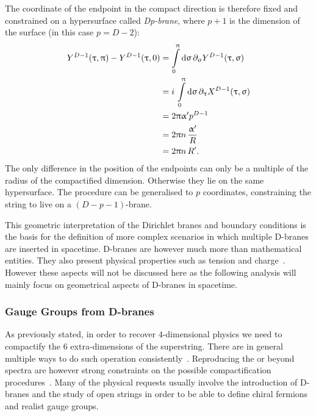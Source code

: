 The coordinate of the endpoint in the compact direction is therefore fixed and constrained on a hypersurface called \emph{Dp-brane}, where $p+1$ is the dimension of the surface (in this case $p = D - 2$):
\begin{equation}
  \begin{split}
    Y^{D-1}( \uptau, \uppi ) - Y^{D-1}( \uptau, 0 )
    & =
    \int\limits_{0}^{\uppi} \dd{\ensuremath{\upsigma}} \partial_{\upsigma} Y^{D-1}( \uptau, \upsigma )
    \\
    & =
    i\, \int\limits_{0}^{\uppi} \dd{\ensuremath{\upsigma}} \partial_{\uptau} X^{D-1}( \uptau, \upsigma)
    \\
    & =
    2 \uppi \upalpha' p^{D-1}
    \\
    & = 
    2 \uppi n\, \frac{\upalpha'}{R}
    \\
    & =
    2 \uppi n\, R'.
  \end{split}
\end{equation}
The only difference in the position of the endpoints can only be a multiple of the radius of the compactified dimension.
Otherwise they lie on the same hypersurface.
The procedure can be generalised to $p$ coordinates, constraining the string to live on a $(D - p - 1)$-brane.

This geometric interpretation of the Dirichlet branes and boundary conditions is the basis for the definition of more complex scenarios in which multiple D-branes are inserted in spacetime.
D-branes are however much more than mathematical entities.
They also present physical properties such as tension and charge~\cite{Polchinski:1995:DirichletBranesRamondRamond,DiVecchia:1997:ClassicalPbranesBoundary,DiVecchia:2006:BoundaryStateMagnetized}.
However these aspects will not be discussed here as the following analysis will mainly focus on geometrical aspects of D-branes in spacetime.


\subsubsection{Gauge Groups from D-branes}

As previously stated, in order to recover $4$-dimensional physics we need to compactify the $6$ extra-dimensions of the superstring.
There are in general multiple ways to do such operation consistently~\cite{Bousso:2000:QuantizationFourformFluxes,Susskind:2003:AnthropicLandscapeString,Kachru:2003:SitterVacuaString}.
Reproducing the \sm or beyond \sm spectra are however strong constraints on the possible compactification procedures~\cite{Cleaver:2007:SearchMinimalSupersymmetric,Lust:2009:LHCStringHunter}.
Many of the physical requests usually involve the introduction of D-branes and the study of open strings in order to be able to define chiral fermions and realist gauge groups.

